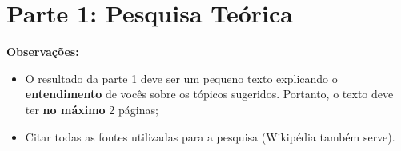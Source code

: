 \documentclass[answers]{exam}
\begin{document}
    \section{Parte 1: Pesquisa Teórica}

    \begin{superframe}
        \textbf{Observações:}

        \begin{itemize}
            \item O resultado da parte 1 deve ser um pequeno texto
                explicando o \textbf{entendimento} de vocês sobre os
                tópicos sugeridos. Portanto, o texto deve ter \textbf{no
                máximo} 2 páginas;
            \item Citar todas as fontes utilizadas para a pesquisa
                (Wikipédia também serve).
        \end{itemize}
    \end{superframe}
\end{document}
